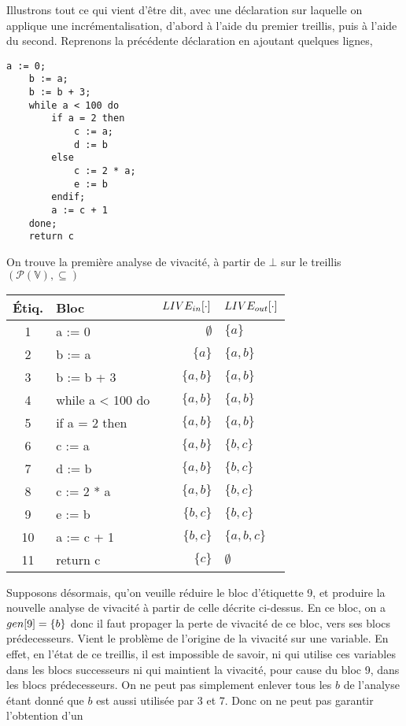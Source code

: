 \documentclass[a4paper, 10pt]{article}
\begin{document}
\begin{example}
Illustrons tout ce qui vient d'être dit, avec une déclaration sur laquelle on applique une incrémentalisation, d'abord à l'aide du premier
treillis, puis à l'aide du second. Reprenons la précédente déclaration en ajoutant quelques lignes,
\begin{lstlisting}[tabsize=2]
	a := 0;
	b := a;
	b := b + 3;
	while a < 100 do
		if a = 2 then
			c := a;
			d := b
		else
			c := 2 * a;
			e := b
		endif;
		a := c + 1
	done;
	return c
\end{lstlisting}
On trouve la première analyse de vivacité, à partir de $\bot$ sur le treillis $(\mathcal{P}(\mathbb{V}), \subseteq)$
\begin{center}
	\begin{tabular}{||c|l|r|l||}
	\hline
	Étiq. & Bloc & $LIVE_{in}[\cdot]$ & $LIVE_{out}[\cdot]$ \\
	\hline
	1 & a := 0 & $\emptyset$ & $\{a\}$\\
	2 & b := a & $\{a\}$ & $\{a, b\}$\\
	3 & b := b + 3 & $\{a, b\}$ & $\{a, b\}$\\
	4 & while a < 100 do & $\{a, b\}$ & $\{a, b\}$\\
	5 & if a = 2 then & $\{a, b\}$ & $\{a, b\}$\\
	6 & c := a & $\{a, b\}$ & $\{b, c\}$\\
	7 & d := b & $\{a, b\}$ & $\{b, c\}$\\
	8 & c := 2 * a & $\{a, b\}$ & $\{b, c\}$\\
	9 & e := b & $\{b, c\}$ & $\{b, c\}$\\
	10 & a := c + 1 & $\{b, c\}$ & $\{a, b, c\}$\\
	11 & return c & $\{c\}$ & $\emptyset$\\
	\hline
	\end{tabular}
\end{center}
Supposons désormais, qu'on veuille réduire le bloc d'étiquette 9, et produire la nouvelle analyse de vivacité
à partir de celle décrite ci-dessus. En ce bloc, on a $gen[9] = \{b\}$ donc il faut propager la perte de vivacité
de ce bloc, vers ses blocs prédecesseurs. Vient le problème de l'origine de la vivacité sur une variable. En effet,
en l'état de ce treillis, il est impossible de savoir, ni qui utilise ces variables dans les blocs successeurs ni qui
maintient la vivacité, pour cause du bloc 9, dans les blocs prédecesseurs. On ne peut pas simplement enlever tous les $b$
de l'analyse étant donné que $b$ est aussi utilisée par 3 et 7. Donc on ne peut pas garantir l'obtention d'un

\end{example}
\end{document}

